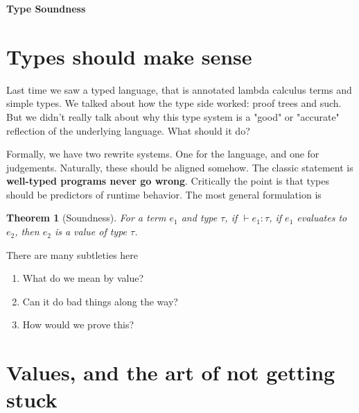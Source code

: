 \documentclass[12pt]{article}
\newtheorem{theorem}{Theorem}
\begin{document}
\baselineskip 12pt

\begin{center}
\textbf{\Large Type Soundness} \\
\end{center}

\section{Types should make sense}
Last time we saw a typed language, that is annotated lambda calculus terms and simple types.
We talked about how the type side worked: proof trees and such.
But we didn't really talk about why this type system is a "good" or "accurate" reflection of the underlying language. 
What should it do?

Formally, we have two rewrite systems.
One for the language, and one for judgements.
Naturally, these should be aligned somehow.
The classic statement is \textbf{well-typed programs never go wrong}.
Critically the point is that types should be predictors of runtime behavior.
The most general formulation is 
\begin{theorem}[Soundness]
  For a term $e_1$ and type $\tau$, if $\vdash e_1 : \tau$, if $e_1$ evaluates to $e_2$, then $e_2$ is a value of type $\tau$.
\end{theorem}

There are many subtleties here
\begin{enumerate}
    \item What do we mean by value?
    \item Can it do bad things along the way?
    \item How would we prove this?
\end{enumerate}

\section{Values, and the art of not getting stuck}
\end{document}
